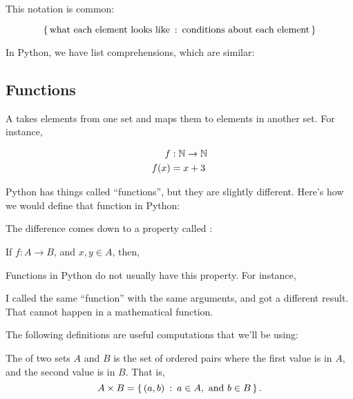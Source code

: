 This notation is common:

\begin{equation*}
  \left\{\, \text{what each element looks like} \::\: \text{conditions about
      each element} \,\right\}
\end{equation*}

In Python, we have list comprehensions, which are similar:


\subsection{Functions}

A  takes elements from one set and maps
them to elements in another set. For instance,

\begin{align*}
  f & : \mathbb{N} \to \mathbb{N} \\
  f(x) & = x + 3
\end{align*}

Python has things called ``functions'', but they are slightly
different. Here's how we would define that function in Python:


The difference comes down to a property called :

\begin{axiom}
  \label{foo}
  If $f : A \to B$, and $x, y \in A$, then, 
\end{axiom}

Functions in Python do not usually have this property. For instance,


I called the same ``function'' with the same arguments, and got a
different result. That cannot happen in a mathematical function.

The following definitions are useful computations that we'll be using:

\begin{definition}
  The  of two sets $A$ and $B$ is the set of
  ordered pairs where the first value is in $A$, and the second value
  is in $B$. That is,
  $$A \times B = \left\{\, (a, b) \::\: a \in A, \text{ and } b \in B \,\right\}.$$
\end{definition}

\begin{definition}
    
\end{definition}

